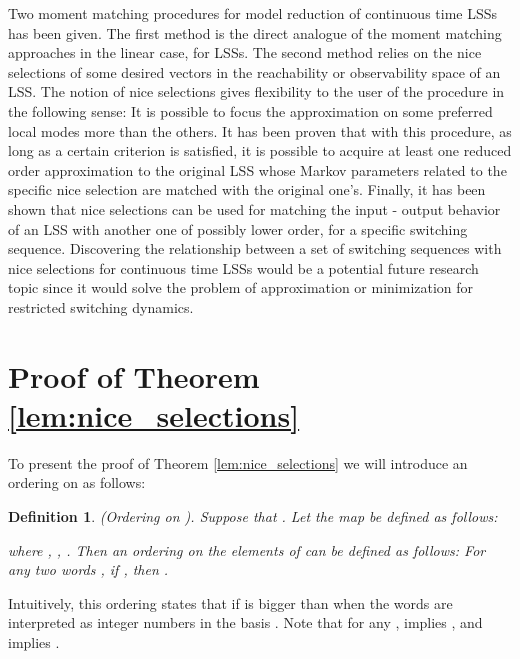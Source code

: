 \documentclass[journal]{IEEEtran}
\newtheorem{Definition}{Definition}
\begin{document}
Two moment matching procedures for model reduction of continuous time LSSs has been given. The first method is the direct analogue of the moment matching approaches in the linear case, for LSSs. The second method relies on the nice selections of some desired vectors in the reachability or observability space of an LSS. The notion of nice selections gives flexibility to the user of the procedure in the following sense: It is possible to focus the approximation on some preferred local modes more than the others. It has been proven that with this procedure, as long as a certain criterion is satisfied, it is possible to acquire at least one reduced order approximation to the original LSS whose Markov parameters related to the specific nice selection are matched with the original one's. Finally, it has been shown that nice selections can be used for matching the input - output behavior of an LSS with another one of possibly lower order, for a specific switching sequence. Discovering the relationship between a set of switching sequences with nice selections for continuous time LSSs would be a potential future research topic since it would solve the problem of approximation or minimization for restricted switching dynamics.







\appendices

\section{Proof of Theorem \ref{lem:nice_selections}}
To present the proof of Theorem \ref{lem:nice_selections} we will introduce an ordering on  as follows:

\begin{Definition} \label{def:lexico}
	\emph{(Ordering on ).} Suppose that . Let the map  be defined as follows:
	
	where , , .
	Then an \emph{ordering}  on the elements of  can be defined as follows: For any two words , if , then . 
\end{Definition}

Intuitively, this ordering states that  if  is bigger than  when the words  are interpreted as integer numbers in the basis . Note that for any ,   implies , and  implies  .
\end{document}
